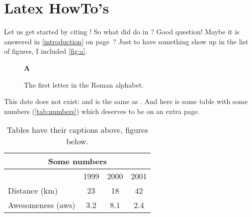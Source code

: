 \documentclass[english,master]{swsLeipzig}
\begin{document}
\chapter{Latex HowTo's}
Let us get started by citing \citet{manning:1999}!
So what did \citeauthor{manning:1999} do in \citeyear{manning:1999}?
Good question!
Maybe it is answered in \autoref{introduction} on page~\pageref{introduction}?
Just to have something show up in the list of figures, I included \autoref{fig:a}.
\begin{figure}[bt]%
  \begin{center}{\huge\bf A}\end{center}
  \caption{The first letter in the Roman alphabet.}\label{fig:a}
\end{figure}
This date does not exist: 
and is the same as .
And here is some table with some numbers (\autoref{tab:numbers})
which deserves to be on an extra page.
\begin{table}[p]%
  \caption{Tables have their captions above, figures below.}
  \begin{center}
    \begin{tabular}{lccc}\toprule
      \multicolumn{4}{c}{Some numbers}\\\midrule
      & 1999 & 2000 & 2001 \\\cmidrule(l){2-4}
      Distance (km) & 23 & 18 & 42 \\
      Awesomeness (aws) & 3.2 & 8.1 & 2.4 \\\bottomrule
    \end{tabular}
  \end{center}\label{tab:numbers}%
\end{table}

\end{document}
